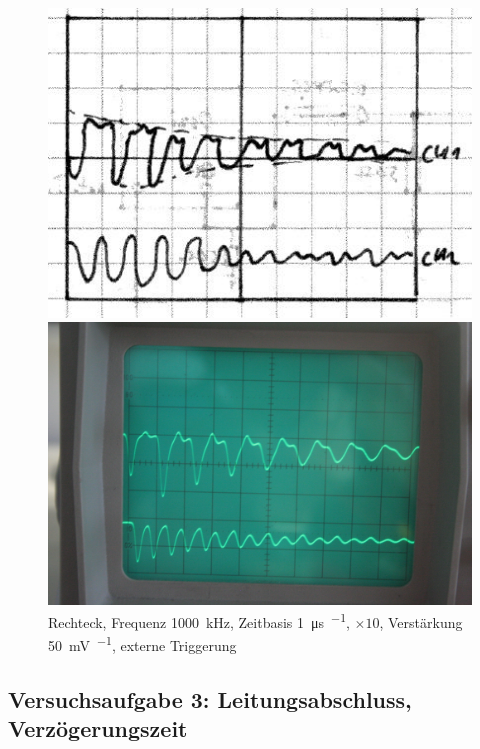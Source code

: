 \begin{figure}[htbp]
	\centering
	\begin{minipage}{.45\linewidth}
	\includegraphics[width=\linewidth]{Skizzen/IMG_0759-1500.jpg}
	\end{minipage}
	\hfill
	\begin{minipage}{.45\linewidth}
	\includegraphics[width=\linewidth]{Fotos/IMG_0759-1500.jpg}
	\end{minipage}
	\caption{%
		Rechteck, Frequenz \SI{1000}{\kilo\hertz},
		Zeitbasis \SI{1}{\micro\second\per\division},
		$\times 10$,
		Verstärkung \SI{50}{\milli\volt\per\division},
		externe Triggerung
	}
	\label{fig:0759}
\end{figure}

\FloatBarrier
\subsection{Versuchsaufgabe 3: Leitungsabschluss, Verzögerungszeit}

